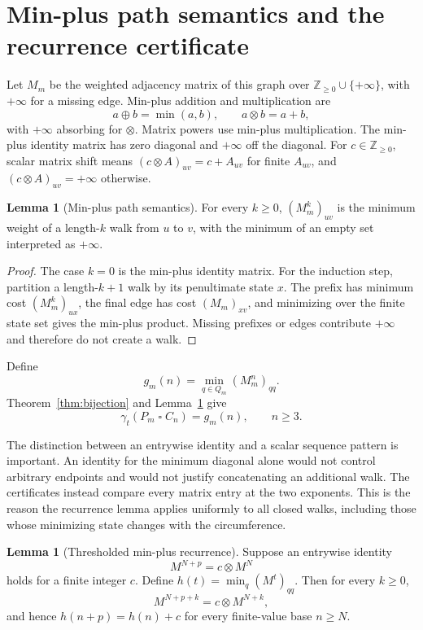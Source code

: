 \documentclass[11pt]{article}
\theoremstyle{definition}
\newtheorem{lemma}[theorem]{Lemma}
\newcommand{\gt}{\gamma_t}
\newcommand{\Zinf}{\mathbb{Z}_{\geq0}\cup\{+\infty\}}
\newcommand{\sq}{\mathbin{\square}}
\begin{document}
\section{Min-plus path semantics and the recurrence certificate}

Let \(M_m\) be the weighted adjacency matrix of this graph over \(\Zinf\),
with \(+\infty\) for a missing edge. Min-plus addition
and multiplication are
\[
a\oplus b=\min(a,b),\qquad a\otimes b=a+b,
\]
with \(+\infty\) absorbing for \(\otimes\). Matrix powers use min-plus
multiplication. The min-plus identity matrix has zero diagonal and
\(+\infty\) off the diagonal. For \(c\in\mathbb Z_{\geq0}\), scalar matrix
shift means \((c\otimes A)_{uv}=c+A_{uv}\) for finite \(A_{uv}\), and
\((c\otimes A)_{uv}=+\infty\) otherwise.

\begin{lemma}[Min-plus path semantics]\label{lem:path}
For every \(k\geq0\), \((M_m^k)_{uv}\) is the minimum weight of a length-\(k\)
walk from \(u\) to \(v\), with the minimum of an empty set interpreted as
\(+\infty\).
\end{lemma}

\begin{proof}
The case \(k=0\) is the min-plus identity matrix. For the induction step,
partition a length-\(k+1\) walk by its penultimate state \(x\). The prefix
has minimum cost \((M_m^k)_{ux}\), the final edge has cost \((M_m)_{xv}\),
and minimizing over the finite state set gives the min-plus product. Missing
prefixes or edges contribute \(+\infty\) and therefore do not create a walk.
\end{proof}

Define
\[
g_m(n)=\min_{q\in Q_m}(M_m^n)_{qq}.
\]
Theorem~\ref{thm:bijection} and Lemma~\ref{lem:path} give
\[
\gt(P_m\sq C_n)=g_m(n),\qquad n\geq3.
\]

The distinction between an entrywise identity and a scalar sequence pattern
is important. An identity for the minimum diagonal alone would not control
arbitrary endpoints and would not justify concatenating an additional walk.
The certificates instead compare every matrix entry at the two exponents.
This is the reason the recurrence lemma applies uniformly to all closed walks,
including those whose minimizing state changes with the circumference.

\begin{lemma}[Thresholded min-plus recurrence]\label{lem:rec}
Suppose an entrywise identity
\[
M^{N+p}=c\otimes M^N
\]
holds for a finite integer \(c\). Define
\(h(t)=\min_q(M^t)_{qq}\). Then for every \(k\geq0\),
\[
M^{N+p+k}=c\otimes M^{N+k},
\]
and hence \(h(n+p)=h(n)+c\) for every finite-value base \(n\geq N\).
\end{lemma}
\end{document}
